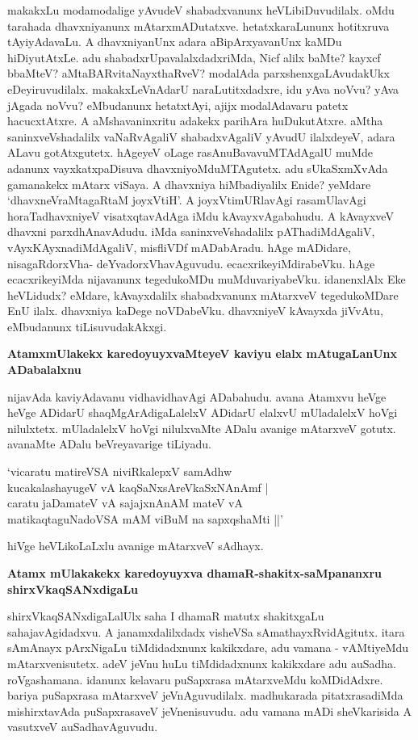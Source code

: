 makakxLu modamodalige yAvudeV shabadxvanunx heVLibiDuvudilalx. oMdu tarahada dhavxniyanunx mAtarxmADutatxve. hetatxkaraLununx hotitxruva tAyiyAdavaLu. A dhavxniyanUnx adara aBipArxyavanUnx kaMDu hiDiyutAtxLe. adu shabadxrUpavalalxdadxriMda, Nicf alilx baMte? kayxcf bbaMteV? aMtaBARvitaNayxthaRveV? modalAda parxshenxgaLAvudakUkx eDeyiruvudilalx. makakxLeVnAdarU naraLutitxdadxre, idu yAva noVvu? yAva jAgada noVvu? eMbudanunx hetatxtAyi, ajijx modalAdavaru patetx hacucxtAtxre. A aMshavaninxritu adakekx parihAra huDukutAtxre. aMtha saninxveVshadalilx vaNaRvAgaliV shabadxvAgaliV yAvudU ilalxdeyeV, adara ALavu gotAtxgutetx. hAgeyeV oLage rasAnuBavavuMTAdAgalU muMde adanunx vayxkatxpaDisuva dhavxniyoMduMTAgutetx. adu sUkaSxmXvAda gamanakekx mAtarx viSaya. A dhavxniya hiMbadiyalilx Enide? yeMdare `dhavxneVraMtagaRtaM joyxVtiH'\label{152}. A joyxVtimURlavAgi rasamUlavAgi horaTadhavxniyeV visatxqtavAdAga iMdu kAvayxvAgabahudu. A kAvayxveV dhavxni parxdhAnavAdudu. iMda saninxveVshadalilx pAThadiMdAgaliV, vAyxKAyxnadiMdAgaliV, misfliVDf mADabAradu. hAge mADidare, nisagaRdorxVha- deYvadorxVhavAguvudu. ecacxrikeyiMdirabeVku. hAge ecacxrikeyiMda nijavanunx tegedukoMDu muMduvariyabeVku. idanenxlAlx Eke heVLidudx? eMdare, kAvayxdalilx shabadxvanunx mAtarxveV tegedukoMDare EnU ilalx. dhavxniya kaDege noVDabeVku. dhavxniyeV kAvayxda jiVvAtu, eMbudanunx tiLisuvudakAkxgi.

\noindent
{\bf\large{AtamxmUlakekx karedoyuyxvaMteyeV kaviyu elalx mAtugaLanUnx ADabalalxnu}}\label{page237}

nijavAda kaviyAdavanu vidhavidhavAgi ADabahudu. avana Atamxvu heVge heVge ADidarU shaqMgArAdigaLalelxV ADidarU elalxvU mUladalelxV hoVgi nilulxtetx. mUladalelxV hoVgi nilulxvaMte ADalu avanige mAtarxveV gotutx. avanaMte ADalu beVreyavarige tiLiyadu.

\begin{shloka}
`vicaratu matireVSA niviRkalepxV samAdhw \\\label{237}
kucakalashayugeV vA kaqSaNxsAreVkaSxNAnAmf |\\
caratu jaDamateV vA sajajxnAnAM mateV vA \\
matikaqtaguNadoVSA mAM viBuM na sapxqshaMti ||'
\end{shloka}

hiVge heVLikoLaLxlu avanige mAtarxveV sAdhayx.

\noindent
{\bf\large{Atamx mUlakakekx karedoyuyxva dhamaR-shakitx-saMpananxru shirxVkaqSANxdigaLu}}\label{page237}

shirxVkaqSANxdigaLalUlx saha I dhamaR matutx shakitxgaLu sahajavAgidadxvu. A janamxdalilxdadx visheVSa sAmathayxRvidAgitutx. itara sAmAnayx pArxNigaLu tiMdidadxnunx kakikxdare, adu vamana - vAMtiyeMdu mAtarxvenisutetx. adeV jeVnu huLu tiMdidadxnunx kakikxdare adu auSadha. roVgashamana. idanunx kelavaru puSapxrasa mAtarxveMdu koMDidAdxre. bariya puSapxrasa mAtarxveV jeVnAguvudilalx. madhukarada pitatxrasadiMda mishirxtavAda puSapxrasaveV jeVnenisuvudu. adu vamana mADi sheVkarisida A vasutxveV auSadhavAguvudu.

